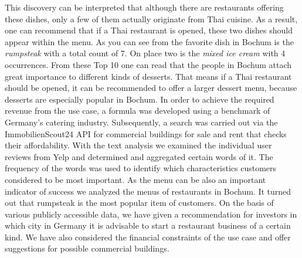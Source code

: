 This discovery can be interpreted that although there are restaurants offering these dishes, only a few of them actually originate from Thai cuisine. As a result, one can recommend that if a Thai restaurant is opened, these two dishes should appear within the menu.
As you can see from  the favorite dish in Bochum is the \textit{rumpsteak} with a total count of 7. On place two is the \textit{mixed ice cream} with 4 occurrences. From these Top 10 one can read that the people in Bochum attach great importance to different kinds of desserts. That means if a Thai restaurant should be opened, it can be recommended to offer a larger dessert menu, because desserts are especially popular in Bochum.
In order to achieve the required revenue from the use case, a formula was developed using a benchmark of Germany's catering industry. Subsequently, a search was carried out via the ImmobilienScout24 \ac{API} for commercial buildings for sale and rent that checks their affordability.
With the text analysis we examined the individual user reviews from Yelp and determined and aggregated certain words of it. The frequency of the words was used to identify which characteristics customers considered to be most important.
As the menu can be also an important indicator of success we analyzed the menus of restaurants in Bochum. It turned out that rumpsteak is the most popular item of customers. \newline
On the basis of various publicly accessible data, we have given a recommendation for investors in which city in Germany it is advisable to start a restaurant business of a certain kind. We have also considered the financial constraints of the use case and offer suggestions for possible commercial buildings.

